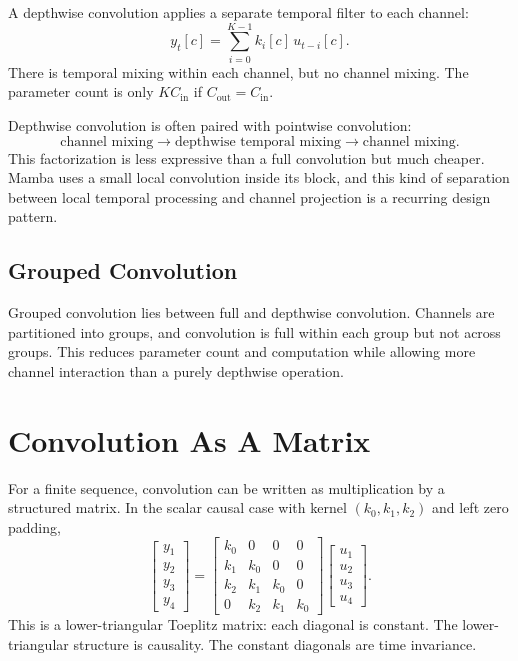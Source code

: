 A depthwise convolution applies a separate temporal filter to each channel:
\[
  y_t[c] = \sum_{i=0}^{K-1} k_i[c]\,u_{t-i}[c].
\]
There is temporal mixing within each channel, but no channel mixing. The parameter count
is only $K C_{\mathrm{in}}$ if $C_{\mathrm{out}}=C_{\mathrm{in}}$.

Depthwise convolution is often paired with pointwise convolution:
\[
  \text{channel mixing} \rightarrow \text{depthwise temporal mixing} \rightarrow
  \text{channel mixing}.
\]
This factorization is less expressive than a full convolution but much cheaper. Mamba
uses a small local convolution inside its block, and this kind of separation between
local temporal processing and channel projection is a recurring design pattern.

\subsection{Grouped Convolution}

Grouped convolution lies between full and depthwise convolution. Channels are partitioned
into groups, and convolution is full within each group but not across groups. This reduces
parameter count and computation while allowing more channel interaction than a purely
depthwise operation.

\section{Convolution As A Matrix}

For a finite sequence, convolution can be written as multiplication by a structured
matrix. In the scalar causal case with kernel $(k_0,k_1,k_2)$ and left zero padding,
\[
\begin{bmatrix}
y_1 \\
y_2 \\
y_3 \\
y_4
\end{bmatrix}
=
\begin{bmatrix}
k_0 & 0   & 0   & 0 \\
k_1 & k_0 & 0   & 0 \\
k_2 & k_1 & k_0 & 0 \\
0   & k_2 & k_1 & k_0
\end{bmatrix}
\begin{bmatrix}
u_1 \\
u_2 \\
u_3 \\
u_4
\end{bmatrix}.
\]
This is a lower-triangular Toeplitz matrix: each diagonal is constant. The lower-triangular
structure is causality. The constant diagonals are time invariance.

